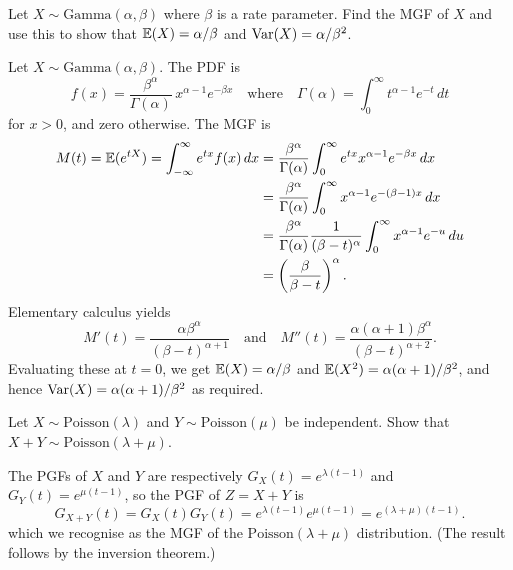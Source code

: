 \begin{exercise}
\begin{questions}

\question %
Let $X\sim\text{Gamma}(\alpha,\beta)$ where $\beta$ is a rate parameter. Find the MGF of $X$ and use this to show that $\mathbb{E}(X)=\alpha/\beta$ and $\text{Var}(X)=\alpha/\beta^2$. 
\begin{answer}
Let $X\sim\text{Gamma}(\alpha,\beta)$. The PDF is
\[
f(x) =  \frac{\beta^{\alpha}}{\Gamma(\alpha)}\, x^{\alpha-1} e^{-\beta x}
\quad\text{where}\quad
\Gamma(\alpha) = \int_0^{\infty} t^{\alpha-1}e^{-t}\,dt
\]
for $x>0$, and zero otherwise. The MGF is
\begin{align*}
M(t) = \mathbb{E}(e^{tX})
	 = \int_{-\infty}^\infty e^{tx} f(x)\,dx 
	& = \frac{\beta^\alpha}{\Gamma(\alpha)}\int_0^\infty e^{tx} x^{\alpha-1}e^{-\beta x}\,dx \\
	& = \frac{\beta^\alpha}{\Gamma(\alpha)}\int_0^\infty x^{\alpha-1}e^{-(\beta-1)x}\,dx \\
	& = \frac{\beta^\alpha}{\Gamma(\alpha)}\frac{1}{(\beta-t)^{\alpha}}\int_0^\infty x^{\alpha-1}e^{-u}\,du \\
	& = \left(\frac{\beta}{\beta-t}\right)^\alpha.
\end{align*}
Elementary calculus yields 
\[
M'(t) = \frac{\alpha\beta^\alpha}{(\beta-t)^{\alpha+1}}
\quad\text{and}\quad
M''(t) = \frac{\alpha(\alpha+1)\beta^\alpha}{(\beta-t)^{\alpha+2}}. 
\]
Evaluating these at $t=0$, we get $\mathbb{E}(X)	= \alpha/\beta$ and $\mathbb{E}(X^2)=\alpha(\alpha+1)/\beta^2$, and hence 
$\text{Var}(X)=\alpha(\alpha+1)/\beta^2$ as required.
\end{answer}

\question %
Let $X\sim\text{Poisson}(\lambda)$ and $Y\sim\text{Poisson}(\mu)$ be independent. Show that $X+Y\sim\text{Poisson}(\lambda+\mu)$.
\begin{answer}
The PGFs of $X$ and $Y$ are respectively $G_X(t)= e^{\lambda(t-1)}$ and $G_Y(t) = e^{\mu(t-1)}$, so the PGF of $Z=X+Y$ is 
\[
G_{X+Y}(t) = G_X(t)G_Y(t) = e^{\lambda(t-1)}e^{\mu(t-1)} = e^{(\lambda+\mu)(t-1)}.
\]
which we recognise as the MGF of the $\text{Poisson}(\lambda+\mu)$ distribution. (The result follows by the inversion theorem.)
\end{answer}



\end{questions}
\end{exercise}
